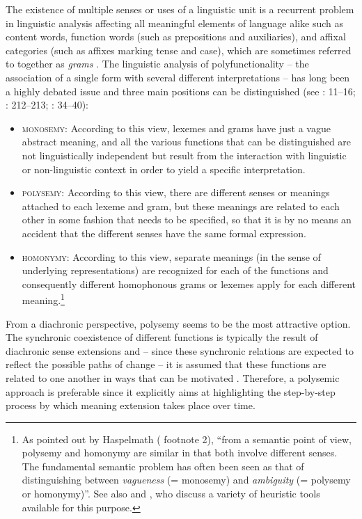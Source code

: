 The existence of multiple senses or uses of a linguistic unit is a recurrent problem in linguistic analysis affecting all meaningful elements of language alike such as content words, function words (such as prepositions and auxiliaries), and affixal categories (such as affixes marking tense and case), which are sometimes referred to together as \textit{grams} \citep{BybeeEtAl1994}. The linguistic analysis of polyfunctionality – the association of a single form with several different interpretations – has long been a highly debated issue and three main positions can be distinguished (see \citealt{TraugottDasher2002}: 11–16; \citealt{Haspelmath2003}: 212–213; \citealt{Hansen2008}: 34–40):

\begin{itemize}
    
\item \textsc{monosemy}: According to this view, lexemes and grams have just a vague abstract meaning, and all the various functions that can be distinguished are not linguistically independent but result from the interaction with linguistic or non-linguistic context in order to yield a specific interpretation.

\item \textsc{polysemy}: According to this view, there are different senses or meanings attached to each lexeme and gram, but these meanings are related to each other in some fashion that needs to be specified, so that it is by no means an accident that the different senses have the same formal expression.

\item \textsc{homonymy}: According to this view, separate meanings (in the sense of underlying representations) are recognized for each of the functions and consequently different homophonous grams or lexemes apply for each different meaning.\footnote{As pointed out by Haspelmath (\citeyear[212]{Haspelmath2003} footnote 2), “from a semantic point of view, polysemy and homonymy are similar in that both involve different senses. The fundamental semantic problem has often been seen as that of distinguishing between \textit{vagueness} (= monosemy) and \textit{ambiguity} (= polysemy or homonymy)”. See also \citet{Tuggy1993} and \citet[37--39]{Hansen2008}, who discuss a variety of heuristic tools available for this purpose.}

\end{itemize}

From a diachronic perspective, polysemy seems to be the most attractive option. The synchronic coexistence of different functions is typically the result of diachronic sense extensions and – since these synchronic relations are expected to reflect the possible paths of change – it is assumed that these functions are related to one another in ways that can be motivated \citep[598]{Hansen2012}. Therefore, a polysemic approach is preferable since it explicitly aims at highlighting the step-by-step process by which meaning extension takes place over time.

